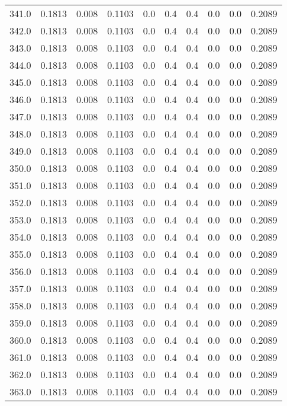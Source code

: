 \begin{longtable}{lrrrrrrrrr}
341.0 & 0.1813 & 0.008 & 0.1103 & 0.0 & 0.4 & 0.4 & 0.0 & 0.0 & 0.2089 \\
342.0 & 0.1813 & 0.008 & 0.1103 & 0.0 & 0.4 & 0.4 & 0.0 & 0.0 & 0.2089 \\
343.0 & 0.1813 & 0.008 & 0.1103 & 0.0 & 0.4 & 0.4 & 0.0 & 0.0 & 0.2089 \\
344.0 & 0.1813 & 0.008 & 0.1103 & 0.0 & 0.4 & 0.4 & 0.0 & 0.0 & 0.2089 \\
345.0 & 0.1813 & 0.008 & 0.1103 & 0.0 & 0.4 & 0.4 & 0.0 & 0.0 & 0.2089 \\
346.0 & 0.1813 & 0.008 & 0.1103 & 0.0 & 0.4 & 0.4 & 0.0 & 0.0 & 0.2089 \\
347.0 & 0.1813 & 0.008 & 0.1103 & 0.0 & 0.4 & 0.4 & 0.0 & 0.0 & 0.2089 \\
348.0 & 0.1813 & 0.008 & 0.1103 & 0.0 & 0.4 & 0.4 & 0.0 & 0.0 & 0.2089 \\
349.0 & 0.1813 & 0.008 & 0.1103 & 0.0 & 0.4 & 0.4 & 0.0 & 0.0 & 0.2089 \\
350.0 & 0.1813 & 0.008 & 0.1103 & 0.0 & 0.4 & 0.4 & 0.0 & 0.0 & 0.2089 \\
351.0 & 0.1813 & 0.008 & 0.1103 & 0.0 & 0.4 & 0.4 & 0.0 & 0.0 & 0.2089 \\
352.0 & 0.1813 & 0.008 & 0.1103 & 0.0 & 0.4 & 0.4 & 0.0 & 0.0 & 0.2089 \\
353.0 & 0.1813 & 0.008 & 0.1103 & 0.0 & 0.4 & 0.4 & 0.0 & 0.0 & 0.2089 \\
354.0 & 0.1813 & 0.008 & 0.1103 & 0.0 & 0.4 & 0.4 & 0.0 & 0.0 & 0.2089 \\
355.0 & 0.1813 & 0.008 & 0.1103 & 0.0 & 0.4 & 0.4 & 0.0 & 0.0 & 0.2089 \\
356.0 & 0.1813 & 0.008 & 0.1103 & 0.0 & 0.4 & 0.4 & 0.0 & 0.0 & 0.2089 \\
357.0 & 0.1813 & 0.008 & 0.1103 & 0.0 & 0.4 & 0.4 & 0.0 & 0.0 & 0.2089 \\
358.0 & 0.1813 & 0.008 & 0.1103 & 0.0 & 0.4 & 0.4 & 0.0 & 0.0 & 0.2089 \\
359.0 & 0.1813 & 0.008 & 0.1103 & 0.0 & 0.4 & 0.4 & 0.0 & 0.0 & 0.2089 \\
360.0 & 0.1813 & 0.008 & 0.1103 & 0.0 & 0.4 & 0.4 & 0.0 & 0.0 & 0.2089 \\
361.0 & 0.1813 & 0.008 & 0.1103 & 0.0 & 0.4 & 0.4 & 0.0 & 0.0 & 0.2089 \\
362.0 & 0.1813 & 0.008 & 0.1103 & 0.0 & 0.4 & 0.4 & 0.0 & 0.0 & 0.2089 \\
363.0 & 0.1813 & 0.008 & 0.1103 & 0.0 & 0.4 & 0.4 & 0.0 & 0.0 & 0.2089 \\

\end{longtable}
